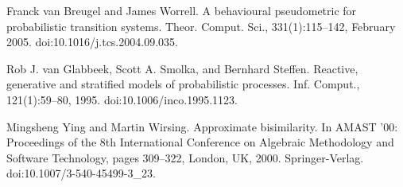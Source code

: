 \par\noindent  [59]  Franck van Breugel and James Worrell.  A behavioural pseudometric for probabilistic transition systems.  Theor. Comput. Sci., 331(1):115–142, February 2005.  doi:10.1016/j.tcs.2004.09.035.  
 
\par\noindent  [60]  Rob J. van Glabbeek, Scott A. Smolka, and Bernhard Steffen.  Reactive, generative and stratified models of probabilistic processes.  Inf. Comput., 121(1):59–80, 1995.  doi:10.1006/inco.1995.1123.  
 
\par\noindent  [61]  Mingsheng Ying and Martin Wirsing.  Approximate bisimilarity.  In AMAST ’00: Proceedings of the 8th International Conference on Algebraic Methodology and Software Technology, pages 309–322, London, UK, 2000. Springer-Verlag.  doi:10.1007/3-540-45499-3\_23.  
  
